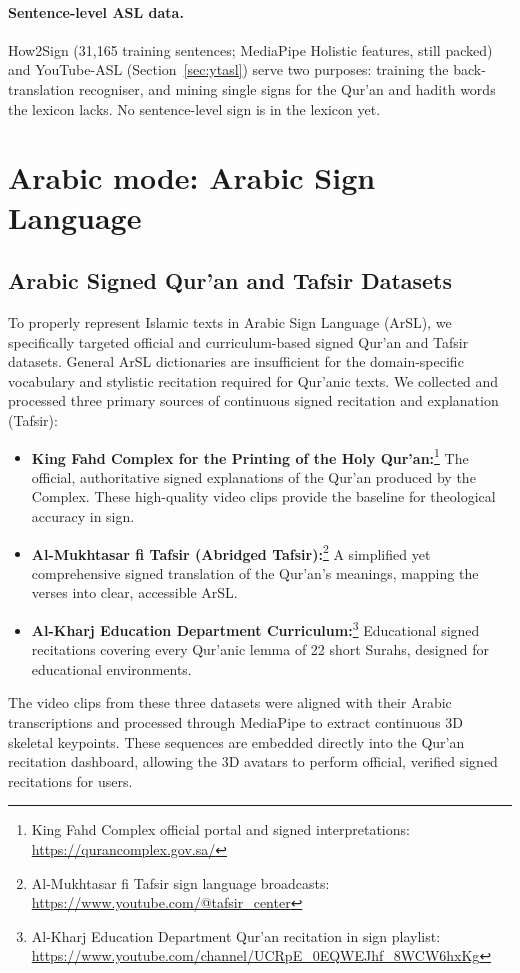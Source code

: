 \paragraph{Sentence-level ASL data.} How2Sign \cite{how2sign} (31,165 training sentences; MediaPipe Holistic
features, still packed) and YouTube-ASL (Section~\ref{sec:ytasl}) serve two purposes: training the back-translation
recogniser, and mining single signs for the Qur'an and hadith words the lexicon lacks. No sentence-level sign is in
the lexicon yet.

\section{Arabic mode: Arabic Sign Language}

\subsection{Arabic Signed Qur'an and Tafsir Datasets}
To properly represent Islamic texts in Arabic Sign Language (ArSL), we specifically targeted official and curriculum-based signed Qur'an and Tafsir datasets. General ArSL dictionaries are insufficient for the domain-specific vocabulary and stylistic recitation required for Qur'anic texts. We collected and processed three primary sources of continuous signed recitation and explanation (Tafsir):
\begin{itemize}
    \item \textbf{King Fahd Complex for the Printing of the Holy Qur'an:}\footnote{King Fahd Complex official portal and signed interpretations: \url{https://qurancomplex.gov.sa/}} The official, authoritative signed explanations of the Qur'an produced by the Complex. These high-quality video clips provide the baseline for theological accuracy in sign.
    \item \textbf{Al-Mukhtasar fi Tafsir (Abridged Tafsir):}\footnote{Al-Mukhtasar fi Tafsir sign language broadcasts: \url{https://www.youtube.com/@tafsir_center}} A simplified yet comprehensive signed translation of the Qur'an's meanings, mapping the verses into clear, accessible ArSL.
    \item \textbf{Al-Kharj Education Department Curriculum:}\footnote{Al-Kharj Education Department Qur'an recitation in sign playlist: \url{https://www.youtube.com/channel/UCRpE_0EQWEJhf_8WCW6hxKg}} Educational signed recitations covering every Qur'anic lemma of 22 short Surahs, designed for educational environments.
\end{itemize}
The video clips from these three datasets were aligned with their Arabic transcriptions and processed through MediaPipe to extract continuous 3D skeletal keypoints. These sequences are embedded directly into the Qur'an recitation dashboard, allowing the 3D avatars to perform official, verified signed recitations for users.

